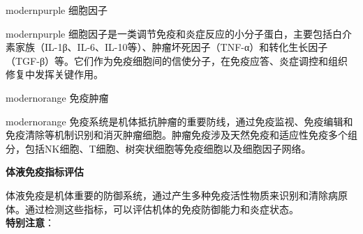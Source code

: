 \documentclass[UTF8]{ctexart}
\begin{document}
\noindent\begin{minipage}{\textwidth}
\parbox{0.25\textwidth}{
\begin{titlebox}{modernpurple}
     \quad 细胞因子
\end{titlebox}}
\hfill
\parbox{0.72\textwidth}{
\begin{contentbox}{modernpurple}
    细胞因子是一类调节免疫和炎症反应的小分子蛋白，主要包括白介素家族（IL-1β、IL-6、IL-10等）、肿瘤坏死因子（TNF-α）和转化生长因子（TGF-β）等。它们作为免疫细胞间的信使分子，在免疫应答、炎症调控和组织修复中发挥关键作用。
\end{contentbox}}
\end{minipage}

\vspace{0.1cm}

\noindent\begin{minipage}{\textwidth}
\parbox{0.25\textwidth}{
\begin{titlebox}{modernorange}
     \quad 免疫肿瘤
\end{titlebox}}
\hfill
\parbox{0.72\textwidth}{
\begin{contentbox}{modernorange}
    免疫系统是机体抵抗肿瘤的重要防线，通过免疫监视、免疫编辑和免疫清除等机制识别和消灭肿瘤细胞。肿瘤免疫涉及天然免疫和适应性免疫多个组分，包括NK细胞、T细胞、树突状细胞等免疫细胞以及细胞因子网络。
\end{contentbox}}
\end{minipage}

\newpage

\begin{tcolorbox}[
    enhanced,
    colback=white,
    colframe=white,
    arc=2mm,
    boxrule=0pt,
    width=\textwidth,
    left=15pt,
    right=15pt,
    top=10pt,
    bottom=10pt,
    drop shadow={
        opacity=0.2,
        color=customTeal
    },
    borderline west={5pt}{0pt}{customTeal}
]
\textcolor{customTeal}{\Large\textbf{体液免疫指标评估}}
\end{tcolorbox}

\vspace{0.05cm}

\begin{tcolorbox}[
    enhanced,
    colback=customTealBg,
    colframe=customTealBg,
    arc=3mm,
    boxrule=0pt,
    width=\textwidth,
    top=8pt,
    bottom=8pt
]
{\small{\color{customTeal}\faInfoCircle} 体液免疫是机体重要的防御系统，通过产生多种免疫活性物质来识别和清除病原体。通过检测这些指标，可以评估机体的免疫防御能力和炎症状态。\\
{\color{orange}\faExclamationTriangle} \textbf{特别注意}：
}
\end{tcolorbox}
\end{document}
